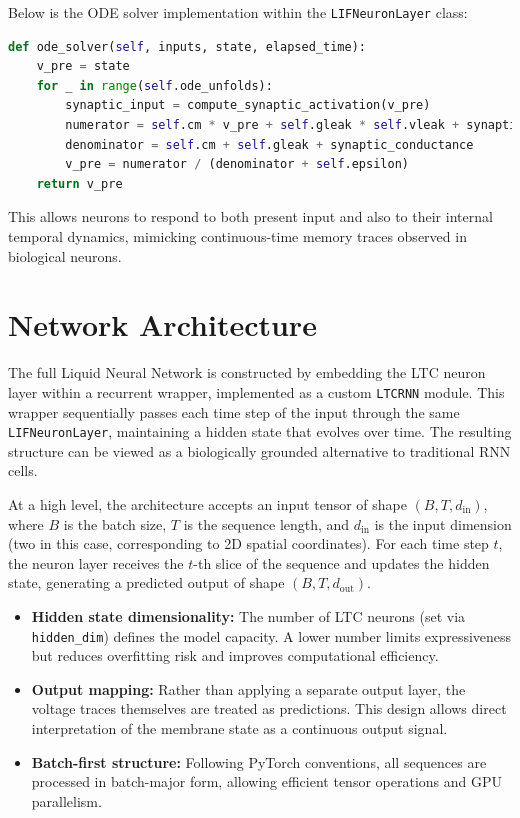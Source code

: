 \noindent Below is the ODE solver implementation within the \texttt{LIFNeuronLayer} class:
\begin{lstlisting}[language=Python, caption={Simplified LTC neuron forward method}]
def ode_solver(self, inputs, state, elapsed_time):
    v_pre = state
    for _ in range(self.ode_unfolds):
        synaptic_input = compute_synaptic_activation(v_pre)
        numerator = self.cm * v_pre + self.gleak * self.vleak + synaptic_input
        denominator = self.cm + self.gleak + synaptic_conductance
        v_pre = numerator / (denominator + self.epsilon)
    return v_pre
\end{lstlisting}
This allows neurons to respond to both present input and also to their internal temporal dynamics, mimicking continuous-time memory traces observed in biological neurons.

\section{Network Architecture}
The full Liquid Neural Network is constructed by embedding the LTC neuron layer within a recurrent wrapper, implemented as a custom \texttt{LTCRNN} module. This wrapper sequentially passes each time step of the input through the same \texttt{LIFNeuronLayer}, maintaining a hidden state that evolves over time. The resulting structure can be viewed as a biologically grounded alternative to traditional RNN cells.

At a high level, the architecture accepts an input tensor of shape $(B, T, d_{\text{in}})$, where $B$ is the batch size, $T$ is the sequence length, and $d_{\text{in}}$ is the input dimension (two in this case, corresponding to 2D spatial coordinates). For each time step $t$, the neuron layer receives the $t$-th slice of the sequence and updates the hidden state, generating a predicted output of shape $(B, T, d_{\text{out}})$.

\vspace{1em}
\begin{itemize}
    \item \textbf{Hidden state dimensionality:} The number of LTC neurons (set via \texttt{hidden\_dim}) defines the model capacity. A lower number limits expressiveness but reduces overfitting risk and improves computational efficiency.
    \item \textbf{Output mapping:} Rather than applying a separate output layer, the voltage traces themselves are treated as predictions. This design allows direct interpretation of the membrane state as a continuous output signal.
    \item \textbf{Batch-first structure:} Following PyTorch conventions, all sequences are processed in batch-major form, allowing efficient tensor operations and GPU parallelism.
\end{itemize}

